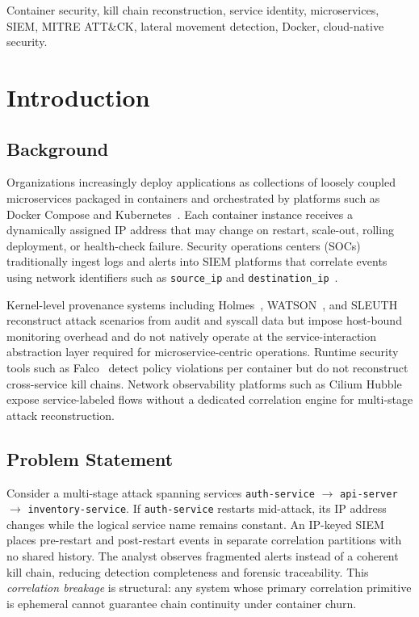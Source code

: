 \documentclass[conference]{IEEEtran}
\begin{document}
\begin{IEEEkeywords}
Container security, kill chain reconstruction, service identity,
microservices, SIEM, MITRE ATT\&CK, lateral movement detection, Docker,
cloud-native security.
\end{IEEEkeywords}

\section{Introduction}

\subsection{Background}
Organizations increasingly deploy applications as collections of
loosely coupled microservices packaged in containers and orchestrated by
platforms such as Docker Compose and Kubernetes~\cite{nsa2021k8s}.
Each container instance receives a dynamically assigned IP address that may
change on restart, scale-out, rolling deployment, or health-check failure.
Security operations centers (SOCs) traditionally ingest logs and alerts into
SIEM platforms that correlate events using network identifiers such as
\texttt{source\_ip} and \texttt{destination\_ip}~\cite{sundaramurthy2014}.

Kernel-level provenance systems including Holmes~\cite{holmes2019},
WATSON~\cite{watson2021}, and SLEUTH~\cite{sleuth2017} reconstruct attack
scenarios from audit and syscall data but impose host-bound monitoring
overhead and do not natively operate at the service-interaction abstraction
layer required for microservice-centric operations. Runtime security tools
such as Falco~\cite{falco2019} detect policy violations per container but
do not reconstruct cross-service kill chains. Network observability
platforms such as Cilium Hubble~\cite{hubble2020} expose service-labeled
flows without a dedicated correlation engine for multi-stage attack
reconstruction.

\subsection{Problem Statement}
Consider a multi-stage attack spanning services
\texttt{auth-service} $\rightarrow$ \texttt{api-server}
$\rightarrow$ \texttt{inventory-service}. If \texttt{auth-service}
restarts mid-attack, its IP address changes while the logical service name
remains constant. An IP-keyed SIEM places pre-restart and post-restart
events in separate correlation partitions with no shared history. The
analyst observes fragmented alerts instead of a coherent kill chain,
reducing detection completeness and forensic traceability. This
\emph{correlation breakage} is structural: any system whose primary
correlation primitive is ephemeral cannot guarantee chain continuity under
container churn.
\end{document}
